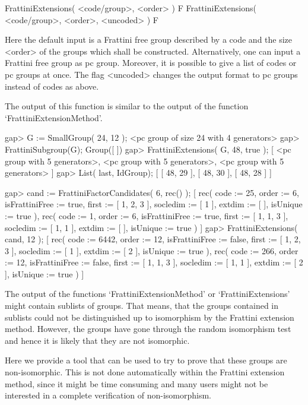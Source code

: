 \> FrattiniExtensions( <code/group>, <order> ) F
\> FrattiniExtensions( <code/group>, <order>, <uncoded> ) F

Here the default input is a Frattini free group described by a code
and the size <order> of the groups which shall be constructed.
Alternatively, one can input a Frattini free group as pc group.
Moreover, it is possible to give a list of codes or pc groups at
once. The flag <uncoded> changes the output format to pc groups
instead of codes as above.

The output of this function is similar to the output of the
function `FrattiniExtensionMethod'.

\beginexample
gap> G := SmallGroup( 24, 12 );
<pc group of size 24 with 4 generators>
gap> FrattiniSubgroup(G);
Group([  ])
gap> FrattiniExtensions( G, 48, true );
[ <pc group with 5 generators>, <pc group with 5 generators>, 
  <pc group with 5 generators> ]
gap> List( last, IdGroup);
[ [ 48, 29 ], [ 48, 30 ], [ 48, 28 ] ]

gap> cand := FrattiniFactorCandidates( 6, rec() );
[ rec( code := 25, order := 6, isFrattiniFree := true, first := [ 1, 2, 3 ], 
      socledim := [ 1 ], extdim := [  ], isUnique := true ), 
  rec( code := 1, order := 6, isFrattiniFree := true, first := [ 1, 1, 3 ], 
      socledim := [ 1, 1 ], extdim := [  ], isUnique := true ) ]
gap> FrattiniExtensions( cand, 12 );
[ rec( code := 6442, order := 12, isFrattiniFree := false, 
      first := [ 1, 2, 3 ], socledim := [ 1 ], extdim := [ 2 ], 
      isUnique := true ), 
  rec( code := 266, order := 12, isFrattiniFree := false, 
      first := [ 1, 1, 3 ], socledim := [ 1, 1 ], extdim := [ 2 ], 
      isUnique := true ) ]
\endexample


The output of the functions `FrattiniExtensionMethod' or `FrattiniExtensions'
might contain sublists of groups. That means, that the groups contained
in sublists could not be distinguished up to isomorphism by the Frattini
extension method. However, the groups have gone through the random
isomorphism test and hence it is likely that they are not isomorphic.

Here we provide a tool that can be used to try to prove that these
groups are non-isomorphic. This is not done automatically within
the Frattini extension method, since it might be time consuming
and many users might not be interested in a complete verification
of non-isomorphism.

